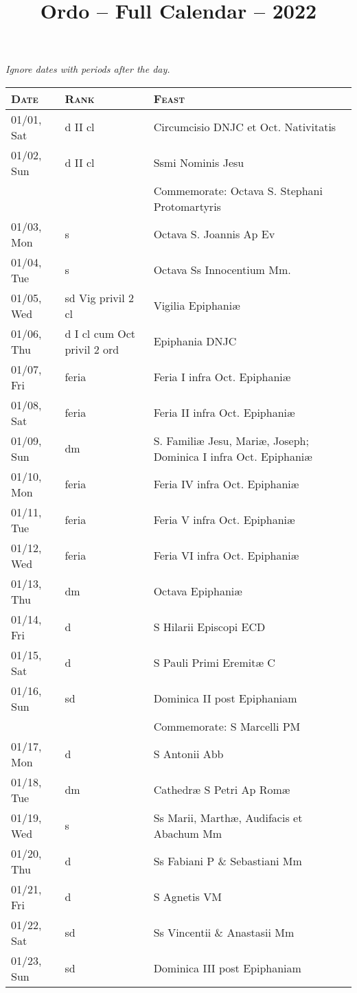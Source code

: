 \documentclass{article}
\title{Ordo -- Full Calendar -- 2022}
\begin{document}
\textit{\centering\footnotesize Ignore dates with periods after the day.}
\begin{longtable}{ l l l }
\hline
\textsc{Date} & \textsc{Rank} & \textsc{Feast} \\
\hline
\endhead
01/01, Sat & d II cl & Circumcisio DNJC et Oct. Nativitatis\\
01/02, Sun & d II cl & Ssmi Nominis Jesu\\
 & & Commemorate: Octava S. Stephani Protomartyris\\
01/03, Mon & s & Octava S. Joannis Ap Ev\\
01/04, Tue & s & Octava Ss Innocentium Mm.\\
01/05, Wed & sd Vig privil 2 cl & Vigilia Epiphaniæ\\
01/06, Thu & d I cl cum Oct privil 2 ord & Epiphania DNJC\\
01/07, Fri & feria & Feria I infra Oct. Epiphaniæ\\
01/08, Sat & feria & Feria II infra Oct. Epiphaniæ\\
01/09, Sun & dm & S. Familiæ Jesu, Mariæ, Joseph; Dominica I infra Oct. Epiphaniæ\\
01/10, Mon & feria & Feria IV infra Oct. Epiphaniæ\\
01/11, Tue & feria & Feria V infra Oct. Epiphaniæ\\
01/12, Wed & feria & Feria VI infra Oct. Epiphaniæ\\
01/13, Thu & dm & Octava Epiphaniæ\\
01/14, Fri & d & S Hilarii Episcopi ECD\\
01/15, Sat & d & S Pauli Primi Eremitæ C\\
01/16, Sun & sd & Dominica II post Epiphaniam\\
 & & Commemorate: S Marcelli PM\\
01/17, Mon & d & S Antonii Abb\\
01/18, Tue & dm & Cathedræ S Petri Ap Romæ\\
01/19, Wed & s & Ss Marii, Marthæ, Audifacis et Abachum Mm\\
01/20, Thu & d & Ss Fabiani P \& Sebastiani Mm\\
01/21, Fri & d & S Agnetis VM\\
01/22, Sat & sd & Ss Vincentii \& Anastasii Mm\\
01/23, Sun & sd & Dominica III post Epiphaniam\\

\end{longtable}
\end{document}
